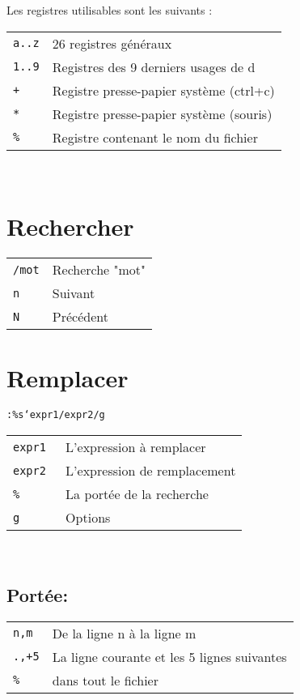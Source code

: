 \documentclass[8pt,landscape,a4paper]{article}
\begin{document}
\begin{multicols*}{3}
    Les registres utilisables sont les suivants :\\

    \begin{tabular}{m{2cm} l}
        \texttt{a..z}& 26 registres généraux\\
        \texttt{1..9}& Registres des 9 derniers usages de d\\
        \texttt{+}   & Registre presse-papier système (ctrl+c)\\
        \texttt{*}   & Registre presse-papier système (souris)\\
        \texttt{\%}  & Registre contenant le nom du fichier\\
    \end{tabular} \\

    \section{Rechercher}
    \begin{tabular}{m{2cm} l}
        \texttt{/mot}& Recherche "mot"\\
        \texttt{n}& Suivant\\
        \texttt{N}& Précédent\\
    \end{tabular}

    \section{Remplacer}
    
    \texttt{:\%s{\char`\/}expr1/expr2/g} \\
    
    \begin{tabular}{m{2cm} l}
        \texttt{expr1 }   &  L'expression à remplacer\\
        \texttt{expr2 }   &  L'expression de remplacement \\
        \texttt{\% }   &  La portée de la recherche\\
        \texttt{g }   &  Options\\
    \end{tabular}\\

    \subsection{Portée:}
    \begin{tabular}{m{2cm} l}
        \texttt{n,m}  & De la ligne n à la ligne m \\
        \texttt{.,+5} & La ligne courante et les 5 lignes suivantes \\
        \texttt{\%}   & dans tout le fichier \\
    \end{tabular}\\


\end{multicols*}
\end{document}
